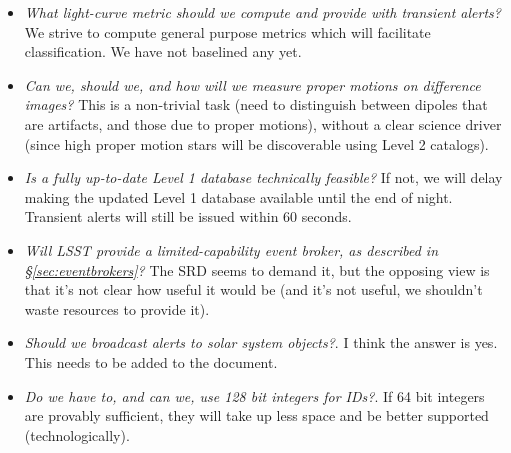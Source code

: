 \documentclass[12pt]{article}
\newcommand{\DB}{{Level 1 database}\xspace}
\begin{document}
\begin{itemize}
    \item {\em What light-curve metric should we compute and provide with transient alerts?} We strive to compute general purpose metrics which will facilitate classification. We have not baselined any yet.
    \item {\em Can we, should we, and how will we measure proper motions on difference images?} This is a non-trivial task (need to distinguish between dipoles that are artifacts, and those due to proper motions), without a clear science driver (since high proper motion stars will be discoverable using Level 2 catalogs).
    \item {\em Is a fully up-to-date \DB technically feasible?} If not, we will delay making the updated \DB available until the end of night. Transient alerts will still be issued within 60 seconds.
    \item {\em Will LSST provide a limited-capability event broker, as described in \S \ref{sec:eventbrokers}?} The SRD seems to demand it, but the opposing view is that it's not clear how useful it would be (and it's not useful, we shouldn't waste resources to provide it).
    \item {\em Should we broadcast alerts to solar system objects?}. I think the answer is yes. This needs to be added to the document.
    \item {\em Do we have to, and can we, use 128 bit integers for IDs?}. If 64 bit integers are provably sufficient, they will take up less space and be better supported (technologically).

\end{itemize}
\end{document}
